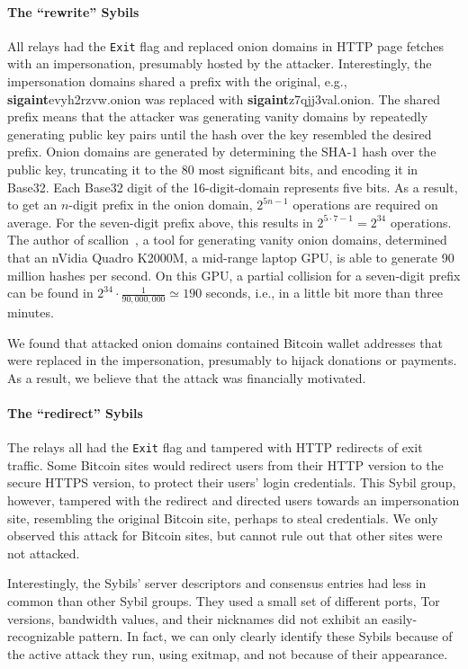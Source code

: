 \paragraph{The ``rewrite'' Sybils}
All relays had the \texttt{Exit} flag and replaced onion domains in HTTP page
fetches with an impersonation, presumably hosted by the attacker.
Interestingly, the impersonation domains shared a prefix with the original,
e.g., \textbf{sigaint}evyh2rzvw.onion was replaced with
\textbf{sigaint}z7qjj3val.onion.  The shared prefix means that the attacker was
generating vanity domains by repeatedly generating public key pairs until the
hash over the key resembled the desired prefix.  Onion domains are generated by
determining the SHA-1 hash over the public key, truncating it to the 80 most
significant bits, and encoding it in Base32.  Each Base32 digit of the
16-digit-domain represents five bits.  As a result, to get an $n$-digit prefix
in the onion domain, $2^{5 n - 1}$ operations are required on average.  For the
seven-digit prefix above, this results in $2^{5 \cdot 7 - 1} = 2^{34}$
operations.  The author of scallion~\cite{scallion}, a tool for generating
vanity onion domains, determined that an nVidia Quadro K2000M, a mid-range
laptop GPU, is able to generate 90 million hashes per second.  On this GPU, a
partial collision for a seven-digit prefix can be found in $2^{34} \cdot
\frac{1}{90,000,000} \simeq 190$ seconds, i.e., in a little bit more than three
minutes.

We found that attacked onion domains contained Bitcoin wallet addresses that
were replaced in the impersonation, presumably to hijack donations or payments.
As a result, we believe that the attack was financially motivated.

\paragraph{The ``redirect'' Sybils}
The relays all had the \texttt{Exit} flag and tampered with HTTP redirects of
exit traffic.  Some Bitcoin sites would redirect users from their HTTP version
to the secure HTTPS version, to protect their users' login credentials.  This
Sybil group, however, tampered with the redirect and directed users towards an
impersonation site, resembling the original Bitcoin site, perhaps to steal
credentials.  We only observed this attack for Bitcoin sites, but cannot rule
out that other sites were not attacked.

Interestingly, the Sybils' server descriptors and consensus entries had less in
common than other Sybil groups.  They used a small set of different ports, Tor
versions, bandwidth values, and their nicknames did not exhibit an
easily-recognizable pattern.  In fact, we can only clearly identify these Sybils
because of the active attack they run, using exitmap, and not because of their
appearance.

